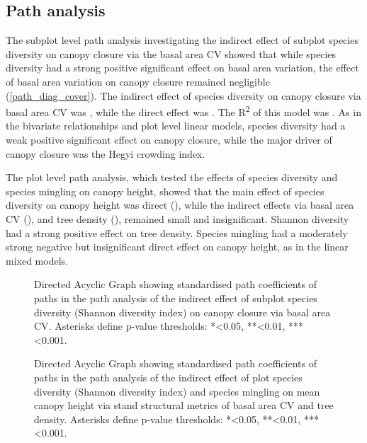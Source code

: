 \documentclass[11pt,a4paper]{article}
\begin{document}


\subsection{Path analysis}

The subplot level path analysis investigating the indirect effect of subplot species diversity on canopy closure via the basal area CV showed that while species diversity had a strong positive significant effect on basal area variation, the effect of basal area variation on canopy closure remained negligible (\autoref{path_diag_cover}). The indirect effect of species diversity on canopy closure via basal area CV was \shannonBaCoverPath{}, while the direct effect was \shannonCoverPath{}. The R\textsuperscript{2} of this model was \coverSemRm{}. As in the bivariate relationships and plot level linear models, species diversity had a weak positive significant effect on canopy closure, while the major driver of canopy closure was the Hegyi crowding index. 

The plot level path analysis, which tested the effects of species diversity and species mingling on canopy height, showed that the main effect of species diversity on canopy height was direct (\treeShannonHeightPath{}), while the indirect effects via basal area CV (\treeShannonBaHeightPath{}), and tree density (\treeShannonDensHeightPath{}), remained small and insignificant. Shannon diversity had a strong positive effect on tree density. Species mingling had a moderately strong negative but insignificant direct effect on canopy height, as in the linear mixed models.

\begin{figure}
	
	\caption{Directed Acyclic Graph showing standardised path coefficients of paths in the path analysis of the indirect effect of subplot species diversity (Shannon diversity index) on canopy closure via basal area CV. Asterisks define p-value thresholds: *<0.05, **<0.01, ***<0.001.}
	\label{path_diag_cover}
\end{figure}

\begin{figure}
	
	\caption{Directed Acyclic Graph showing standardised path coefficients of paths in the path analysis of the indirect effect of plot species diversity (Shannon diversity index) and species mingling on mean canopy height via stand structural metrics of basal area CV and tree density. Asterisks define p-value thresholds: *<0.05, **<0.01, ***<0.001.}
	\label{path_diag_height}
\end{figure}
\end{document}
